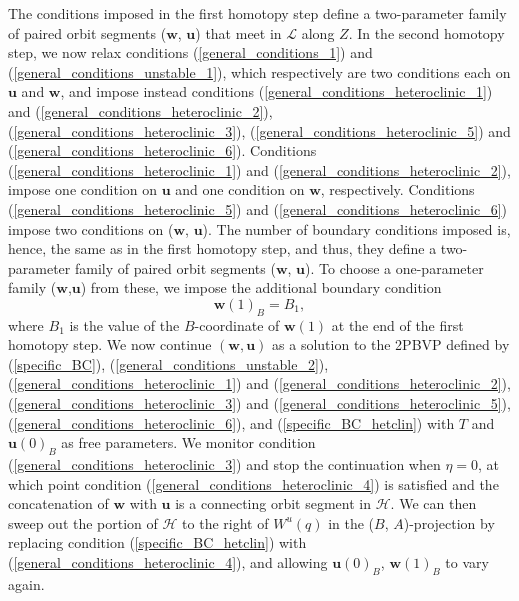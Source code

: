 \documentclass{ws-ijbc}
\begin{document}
The conditions imposed in the first homotopy step define a two-parameter family of paired orbit segments ($\mathbf{w}$, $\mathbf{u}$) that meet in $\mathscr{L}$ along $Z$.  In the second homotopy step, we now relax conditions (\ref{general_conditions_1}) and (\ref{general_conditions_unstable_1}), which respectively are two conditions each on $\mathbf{u}$ and $\mathbf{w}$, and impose instead conditions (\ref{general_conditions_heteroclinic_1}) and (\ref{general_conditions_heteroclinic_2}), (\ref{general_conditions_heteroclinic_3}), (\ref{general_conditions_heteroclinic_5}) and (\ref{general_conditions_heteroclinic_6}).    Conditions (\ref{general_conditions_heteroclinic_1}) and  (\ref{general_conditions_heteroclinic_2}), impose one condition on $\mathbf{u}$ and one condition on $\mathbf{w}$, respectively.  Conditions  (\ref{general_conditions_heteroclinic_5}) and (\ref{general_conditions_heteroclinic_6}) impose two conditions on ($\mathbf{w}$, $\mathbf{u}$).  The number of boundary conditions imposed is, hence, the same as in the first homotopy step, and thus, they define a two-parameter family of paired orbit segments ($\mathbf{w}$, $\mathbf{u}$).  To choose a one-parameter family ($\mathbf{w}$,$\mathbf{u}$) from these, we impose the additional boundary condition 
	\begin{equation}
		\mathbf{w}(1)_B = B_1,
		\label{specific_BC_hetclin}
	\end{equation}
where $B_1$ is the value of the $B$-coordinate of $\mathbf{w}(1)$ at the end of the first homotopy step.  We now continue $(\mathbf{w}, \mathbf{u})$ as a solution to the 2PBVP defined by (\ref{specific_BC}), (\ref{general_conditions_unstable_2}), (\ref{general_conditions_heteroclinic_1}) and (\ref{general_conditions_heteroclinic_2}), (\ref{general_conditions_heteroclinic_3}) and (\ref{general_conditions_heteroclinic_5}), (\ref{general_conditions_heteroclinic_6}), and (\ref{specific_BC_hetclin}) with $T$ and $\mathbf{u}(0)_B$ as free parameters.  We monitor condition (\ref{general_conditions_heteroclinic_3}) and stop the continuation when $\eta=0$, at which point condition (\ref{general_conditions_heteroclinic_4}) is satisfied and the concatenation of $\mathbf{w}$ with $\mathbf{u}$ is a connecting orbit segment in $\mathscr{H}$.  We can then sweep out the portion of $\mathscr{H}$ to the right of $W^u(q)$ in the ($B$, $A$)-projection by replacing condition (\ref{specific_BC_hetclin}) with (\ref{general_conditions_heteroclinic_4}), and allowing $\mathbf{u}(0)_B$, $\mathbf{w}(1)_B$ to vary again.
\end{document}

